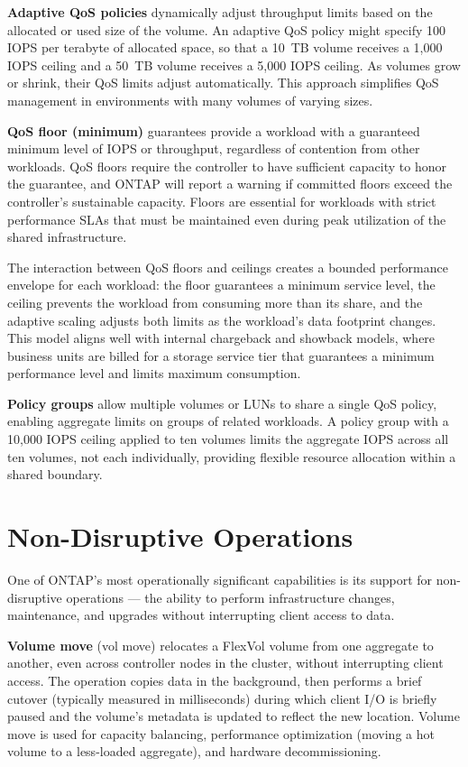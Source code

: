 \textbf{Adaptive QoS policies} dynamically adjust throughput limits based on the allocated or used size of the volume. An adaptive QoS policy might specify 100 IOPS per terabyte of allocated space, so that a 10~TB volume receives a 1,000 IOPS ceiling and a 50~TB volume receives a 5,000 IOPS ceiling. As volumes grow or shrink, their QoS limits adjust automatically. This approach simplifies QoS management in environments with many volumes of varying sizes.

\textbf{QoS floor (minimum)} guarantees provide a workload with a guaranteed minimum level of IOPS or throughput, regardless of contention from other workloads. QoS floors require the controller to have sufficient capacity to honor the guarantee, and ONTAP will report a warning if committed floors exceed the controller's sustainable capacity. Floors are essential for workloads with strict performance SLAs that must be maintained even during peak utilization of the shared infrastructure.

The interaction between QoS floors and ceilings creates a bounded performance envelope for each workload: the floor guarantees a minimum service level, the ceiling prevents the workload from consuming more than its share, and the adaptive scaling adjusts both limits as the workload's data footprint changes. This model aligns well with internal chargeback and showback models, where business units are billed for a storage service tier that guarantees a minimum performance level and limits maximum consumption.

\textbf{Policy groups} allow multiple volumes or LUNs to share a single QoS policy, enabling aggregate limits on groups of related workloads. A policy group with a 10,000 IOPS ceiling applied to ten volumes limits the aggregate IOPS across all ten volumes, not each individually, providing flexible resource allocation within a shared boundary.

\section{Non-Disruptive Operations}

One of ONTAP's most operationally significant capabilities is its support for non-disruptive operations --- the ability to perform infrastructure changes, maintenance, and upgrades without interrupting client access to data.

\textbf{Volume move} (vol move) relocates a FlexVol volume from one aggregate to another, even across controller nodes in the cluster, without interrupting client access. The operation copies data in the background, then performs a brief cutover (typically measured in milliseconds) during which client I/O is briefly paused and the volume's metadata is updated to reflect the new location. Volume move is used for capacity balancing, performance optimization (moving a hot volume to a less-loaded aggregate), and hardware decommissioning.


